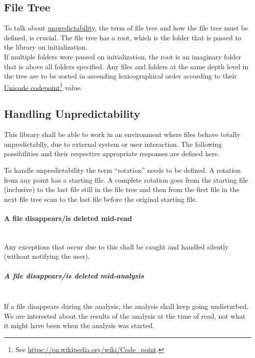 \documentclass[11pt]{article} %
\begin{document}
    \subsection{File Tree}\label{sec:3.1}

    To talk about \hyperref[sec:3.1]{unpredictability}, the term of file tree and how the file tree must be defined, is crucial. The file tree has a root, which is the folder that is passed to the library on initialization.\\If multiple folders were passed on initialization, the root is an imaginary folder that is above all folders specified. Any files and folders at the same depth level in the tree are to be sorted in ascending lexicographical order according to their \href{https://en.wikipedia.org/wiki/Code_point}{Unicode codepoint}\footnote{See \url{https://en.wikipedia.org/wiki/Code_point}.} value.

    \subsection{Handling Unpredictability}\label{sec:3.2}

    This library shall be able to work in an environment where files behave totally unpredictablly, due to external system or user interaction. The following possibilities and their respective appropriate responses are defined here.

    To handle unpredictability the term ``rotation'' needs to be defined. A rotation from any point has a starting file. A complete rotation goes from the starting file (inclusive) to the last file still in the file tree and then from the first file in the next file tree scan to the last file before the original starting file.

    \paragraph{A file disappears/is deleted mid-read}\label{par:file_disappear} ~\\
    Any exceptions that occur due to this shall be caught and handled silently (without notifying the user).

    \subparagraph{A file disappears/is deleted mid-analysis} ~\\
    If a file disappears during the analysis, the analysis shall keep going undisturbed. We are interested about the results of the analysis at the time of read, not what it might have been when the analysis was started.
\end{document}
